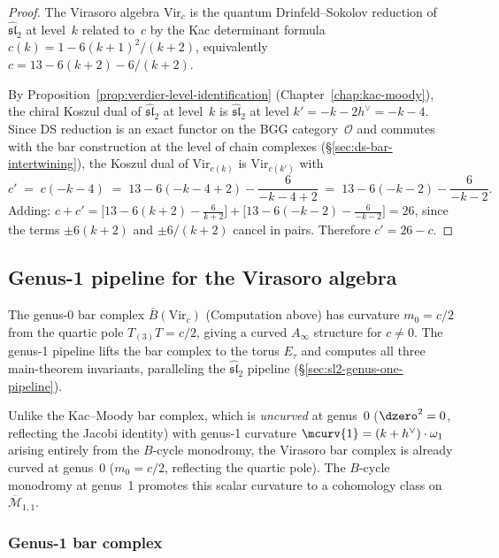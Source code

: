 \begin{proof}
The Virasoro algebra $\mathrm{Vir}_c$ is the quantum
Drinfeld--Sokolov reduction of $\widehat{\mathfrak{sl}}_2$ at
level~$k$ related to~$c$ by the Kac determinant formula
$c(k) = 1 - 6(k+1)^2/(k+2)$, equivalently
$c = 13 - 6(k+2) - 6/(k+2)$.

By Proposition~\ref{prop:verdier-level-identification}
(Chapter~\ref{chap:kac-moody}), the chiral Koszul dual of
$\widehat{\mathfrak{sl}}_2$ at level~$k$ is
$\widehat{\mathfrak{sl}}_2$ at level
$k' = -k - 2h^\vee = -k - 4$.
Since DS reduction is an exact functor on the BGG
category~$\mathcal{O}$ and commutes with the bar
construction at the level of chain complexes
(\S\ref{sec:ds-bar-intertwining}), the Koszul dual of
$\mathrm{Vir}_{c(k)}$ is $\mathrm{Vir}_{c(k')}$ with
\[
c' \;=\; c(-k-4)
\;=\; 13 - 6(-k-4+2) - \frac{6}{-k-4+2}
\;=\; 13 - 6(-k-2) - \frac{6}{-k-2}.
\]
Adding:
$c + c' = \bigl[13 - 6(k+2) - \frac{6}{k+2}\bigr]
+ \bigl[13 - 6(-k-2) - \frac{6}{-k-2}\bigr]
= 26$,
since the terms $\pm 6(k+2)$ and $\pm 6/(k+2)$ cancel in pairs.
Therefore $c' = 26 - c$.
\end{proof}

\subsection{Genus-1 pipeline for the Virasoro algebra}
\label{sec:virasoro-genus-one-pipeline}

The genus-0 bar complex $\bar{B}(\mathrm{Vir}_c)$ (Computation above)
has curvature $m_0 = c/2$ from the quartic pole $T_{(3)}T = c/2$, giving a curved
$A_\infty$ structure for $c \neq 0$.  The genus-1 pipeline lifts the bar complex to the torus $E_\tau$ and computes all three
main-theorem invariants, paralleling the
$\widehat{\mathfrak{sl}}_2$ pipeline (\S\ref{sec:sl2-genus-one-pipeline}).

Unlike the Kac--Moody bar complex, which is
\emph{uncurved} at genus~0 ($\dzero^2 = 0$, reflecting the Jacobi identity) with
genus-1 curvature $\mcurv{1} = (k+h^\vee)\cdot\omega_1$ arising entirely from the $B$-cycle
monodromy, the Virasoro bar complex is already curved at genus~0
($m_0 = c/2$, reflecting the quartic pole).  The $B$-cycle monodromy at
genus~1 promotes this scalar curvature to a cohomology class on
$\overline{\mathcal{M}}_{1,1}$.

\subsubsection{Genus-1 bar complex}

